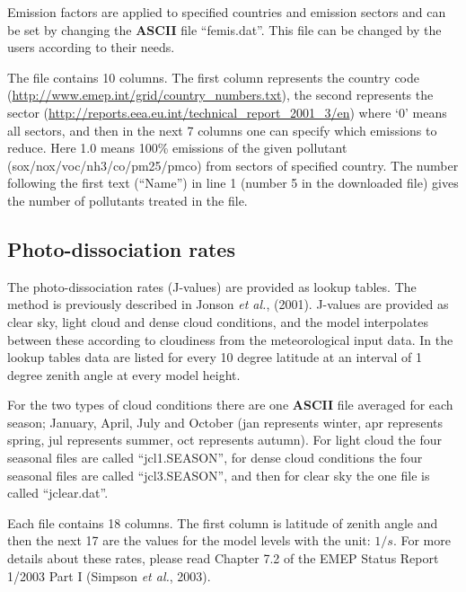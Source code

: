 Emission factors are applied to specified countries and
emission sectors and can be set by changing the {\bf ASCII} file
``femis.dat''. 
This file can be changed by the users according to their needs.

The file contains 10 columns. The first column represents
the country code (\url{http://www.emep.int/grid/country_numbers.txt}),
the second represents the sector
(\url{http://reports.eea.eu.int/technical_report_2001_3/en}) 
where `0' means all sectors, and then in the next 7 columns one can specify
which emissions to reduce. Here 1.0 means 100\% emissions of the given
pollutant 
(sox/nox/voc/nh3/co/pm25/pmco) from sectors of specified country. The
number following the first text (``Name'') in line 1 (number 5 in
the downloaded file) gives the number of pollutants treated in the file.

\subsection{Photo-dissociation rates}
The photo-dissociation rates (J-values) are provided as lookup
tables. The method is previously described in Jonson {\sl et
al.}, (2001). J-values are provided as clear sky, light cloud and dense
cloud conditions, and the model interpolates between these according
to cloudiness from the meteorological input data. In the lookup tables
data are listed for every 10 degree latitude at an interval of 1
degree zenith angle at every model height.

For the two types of cloud conditions there are one {\bf ASCII} file 
averaged for each season; January, April, July and October (jan represents
winter, apr represents spring, jul represents summer, oct represents
autumn). For light
cloud the four seasonal files are called ``jcl1.SEASON'', for dense cloud conditions
the four seasonal files are called ``jcl3.SEASON'', and then for clear sky the one file 
is called ``jclear.dat''.

Each file contains 18 columns. The first column is latitude of zenith 
angle and then the
next 17 are the values for the model levels with the unit: $1/s$. 
For more details about these rates, please read Chapter 7.2 of the EMEP
Status Report 1/2003 Part I (Simpson {\sl et al.}, 2003).

